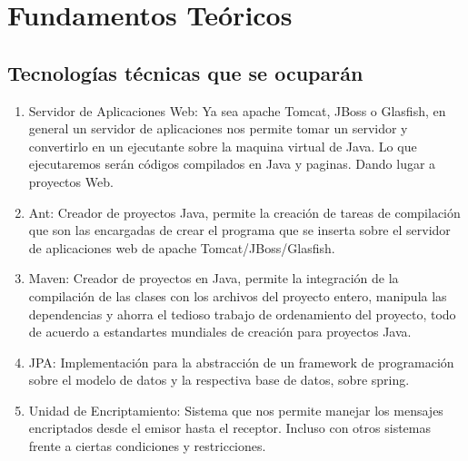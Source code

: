 \documentclass[a4paper,12pt,openany,oneside]{book}
\begin{document}
\section{Fundamentos Teóricos}
\subsection{Tecnologías técnicas que se ocuparán}
\begin{enumerate}
\item Servidor de Aplicaciones Web: Ya sea apache Tomcat, JBoss o Glasfish, en general un servidor de aplicaciones nos permite tomar un servidor y convertirlo en un ejecutante sobre la maquina virtual de Java. Lo que ejecutaremos serán códigos compilados en Java y paginas. Dando lugar a proyectos Web.
\item Ant: Creador de proyectos Java, permite la creación de tareas de compilación que son las encargadas de crear el programa que se inserta sobre el servidor de aplicaciones web de apache Tomcat/JBoss/Glasfish.
\item Maven: Creador de proyectos en Java, permite la integración de la compilación de las clases con los archivos del proyecto entero, manipula las dependencias y ahorra el tedioso trabajo de ordenamiento del proyecto, todo de acuerdo a estandartes mundiales de creación para proyectos Java.
\item JPA: Implementación para la abstracción de un framework de programación sobre el modelo de datos y la respectiva base de datos, sobre spring.
\item Unidad de Encriptamiento: Sistema que nos permite manejar los mensajes encriptados desde el emisor hasta el receptor. Incluso con otros sistemas frente a ciertas condiciones y restricciones.
\end{enumerate}
\end{document}
